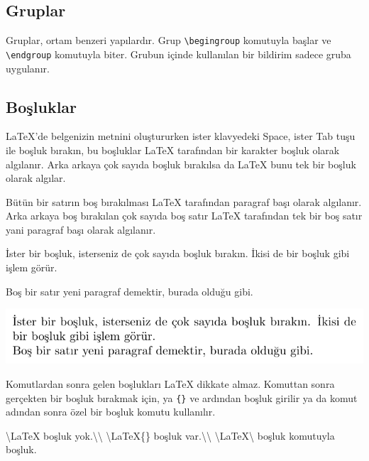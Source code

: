 \documentclass[
  10pt,
]{scrbook}
\newenvironment{Shaded}{\begin{snugshade}}{\end{snugshade}}
\newcommand{\FunctionTok}[1]{\textcolor[rgb]{0.00,0.00,0.00}{#1}}
\newcommand{\NormalTok}[1]{#1}
\theoremstyle{definition}
\theoremstyle{definition}
\theoremstyle{definition}
\theoremstyle{definition}
\theoremstyle{remark}
\begin{document}
\hypertarget{gruplar}{%
\subsection{Gruplar}\label{gruplar}}

Gruplar, ortam benzeri yapılardır. Grup \texttt{\textbackslash{}begingroup} komutuyla başlar ve \texttt{\textbackslash{}endgroup} komutuyla biter. Grubun içinde kullanılan bir bildirim sadece gruba uygulanır.

\hypertarget{bosluk}{%
\subsection{Boşluklar}\label{bosluk}}

LaTeX'de belgenizin metnini oluştururken ister klavyedeki Space, ister Tab tuşu ile boşluk bırakın, bu boşluklar LaTeX tarafından bir karakter boşluk olarak algılanır. Arka arkaya çok sayıda boşluk bırakılsa da LaTeX bunu tek bir boşluk olarak algılar.

Bütün bir satırın boş bırakılması LaTeX tarafından paragraf başı olarak algılanır. Arka arkaya boş bırakılan çok sayıda boş satır LaTeX tarafından tek bir boş satır yani paragraf başı olarak algılanır.

\begin{Shaded}
\begin{Highlighting}[]
\NormalTok{ İster bir boşluk, isterseniz de çok         sayıda boşluk bırakın. }
\NormalTok{İkisi de bir boşluk gibi işlem görür. }

\NormalTok{Boş bir satır yeni paragraf demektir, burada olduğu gibi.}
\end{Highlighting}
\end{Shaded}

\insvg

\includegraphics{examples/ex1.svg} \outsvg

Komutlardan sonra gelen boşlukları LaTeX dikkate almaz. Komuttan sonra gerçekten bir boşluk bırakmak için, ya \texttt{\{\}} ve ardından boşluk girilir ya da komut adından sonra özel bir boşluk komutu kullanılır.

\begin{Shaded}
\begin{Highlighting}[]
\FunctionTok{\textbackslash{}LaTeX}\NormalTok{  boşluk yok.}\FunctionTok{\textbackslash{}\textbackslash{}}
\FunctionTok{\textbackslash{}LaTeX}\NormalTok{\{\} boşluk var.}\FunctionTok{\textbackslash{}\textbackslash{}}
\FunctionTok{\textbackslash{}LaTeX\textbackslash{} }\NormalTok{boşluk komutuyla  boşluk.}
\end{Highlighting}
\end{Shaded}
\end{document}
